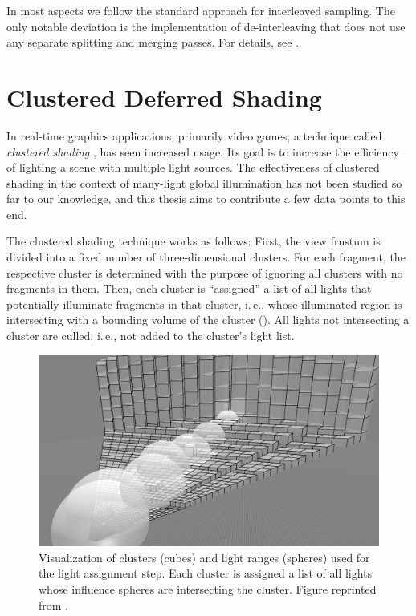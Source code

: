                  In most aspects we follow the standard approach for interleaved sampling. The only notable deviation is the implementation of de-interleaving that does not use any separate splitting and merging passes. For details, see .



\section{Clustered Deferred Shading}
\label{sec:concept:clusteredShading}

In real-time graphics applications, primarily video games, a technique called \textit{clustered shading} \citep{olsson2012clustered}, has seen increased usage. Its goal is to increase the efficiency of lighting a scene with multiple light sources.
The effectiveness of clustered shading in the context of many-light global illumination has not been studied so far to our knowledge, and this thesis aims to contribute a few data points to this end.

The clustered shading technique works as follows: First, the view frustum is divided into a fixed number of three-dimensional clusters. For each fragment, the respective cluster is determined with the purpose of ignoring all clusters with no fragments in them. Then, each cluster is ``assigned'' a list of all lights that potentially illuminate fragments in that cluster, i.\,e., whose illuminated region is intersecting with a bounding volume of the cluster (). All lights not intersecting a cluster are culled, i.\,e., not added to the cluster's light list.

\begin{figure}[htb]
\centering
    \includegraphics[width=\textwidth]{graphics/clustered_olsson}
  \caption{Visualization of clusters (cubes) and light ranges (spheres) used for the light assignment step. Each cluster is assigned a list of all lights whose influence spheres are intersecting the cluster. Figure reprinted from \citet{Olsson:2015:manylightmanagement}.}
  \label{fig:concept:clustered_olsson}
\end{figure}


